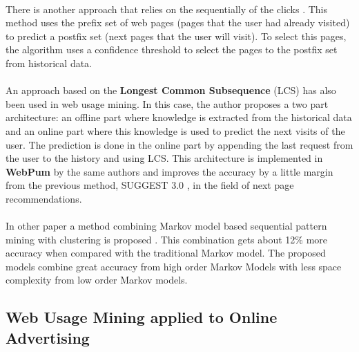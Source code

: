 \paragraph{}

There is another approach that relies on the sequentially of the clicks
\cite{Jan:2007:WUB:1353862.1353874}.
This method uses the prefix set of web pages (pages that the user had already
visited) to predict a postfix set (next pages that the user will visit).
To select this pages, the algorithm uses a confidence threshold to select the pages
to the postfix set from historical data.


\paragraph{}

An approach based on the \textbf{Longest Common Subsequence} (LCS)
\cite{4631852} has also been used in web usage mining. In this case, the author
proposes a two part architecture: an offline part where knowledge is extracted
from the historical data and an online part where this knowledge is used to
predict the next visits of the user. The prediction is done in the online part by
appending the last request from the user to the history and using LCS. This
architecture is implemented in \textbf{WebPum} \cite{Jalali20106201} by the same
authors and improves the accuracy by a little margin from the
previous method, SUGGEST 3.0 \cite{1410804}, in the field of next page recommendations.

\paragraph{}

In other paper a method combining Markov model based sequential pattern
mining with clustering is proposed \cite{Anitha_anew}. This combination gets
about 12\% more accuracy when compared with the traditional Markov model.
The proposed models combine great accuracy from high order Markov Models with
less space complexity from low order Markov models.

\subsection{Web Usage Mining applied to Online Advertising}

